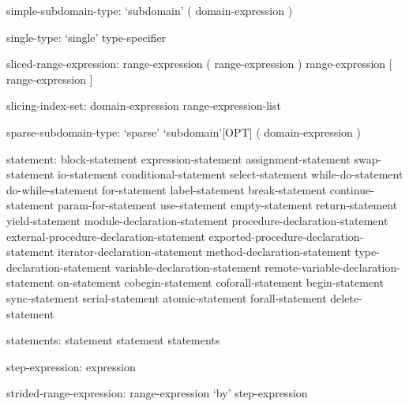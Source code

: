 \begin{syntax}
simple-subdomain-type:
  `subdomain' ( domain-expression )
\end{syntax}

\begin{syntax}
single-type:
  `single' type-specifier
\end{syntax}

\begin{syntax}
sliced-range-expression:
  range-expression ( range-expression )
  range-expression [ range-expression ]
\end{syntax}

\begin{syntax}
slicing-index-set:
  domain-expression
  range-expression-list
\end{syntax}

\begin{syntax}
sparse-subdomain-type:
  `sparse' `subdomain'[OPT] ( domain-expression )
\end{syntax}

\begin{syntax}
statement:
  block-statement
  expression-statement
  assignment-statement
  swap-statement
  io-statement
  conditional-statement
  select-statement
  while-do-statement
  do-while-statement
  for-statement
  label-statement
  break-statement
  continue-statement
  param-for-statement
  use-statement
  empty-statement
  return-statement
  yield-statement
  module-declaration-statement
  procedure-declaration-statement
  external-procedure-declaration-statement
  exported-procedure-declaration-statement
  iterator-declaration-statement
  method-declaration-statement
  type-declaration-statement
  variable-declaration-statement
  remote-variable-declaration-statement
  on-statement
  cobegin-statement
  coforall-statement
  begin-statement
  sync-statement
  serial-statement
  atomic-statement
  forall-statement
  delete-statement
\end{syntax}

\begin{syntax}
statements:
  statement
  statement statements
\end{syntax}

\begin{syntax}
step-expression:
  expression
\end{syntax}

\begin{syntax}
strided-range-expression:
  range-expression `by' step-expression
\end{syntax}

